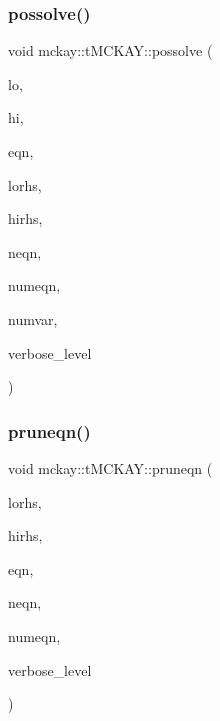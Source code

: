 \subsubsection{\texorpdfstring{possolve()}{possolve()}}
{\footnotesize\ttfamily void mckay\+::t\+M\+C\+K\+A\+Y\+::possolve (\begin{DoxyParamCaption}\item[{vector$<$ int $>$ \&}]{lo,  }\item[{vector$<$ int $>$ \&}]{hi,  }\item[{vector$<$ \mbox{\hyperlink{namespacemckay_a4f7cb66ed07fe573b2b08e73ab462c1a}{equation}} $>$ \&}]{eqn,  }\item[{vector$<$ int $>$ \&}]{lorhs,  }\item[{vector$<$ int $>$ \&}]{hirhs,  }\item[{vector$<$ int $>$ \&}]{neqn,  }\item[{int}]{numeqn,  }\item[{int}]{numvar,  }\item[{int}]{verbose\+\_\+level }\end{DoxyParamCaption})}

\mbox{\label{classmckay_1_1t_m_c_k_a_y_a0faf3830d1f34b4a6128fd237e0a9165}} 
\subsubsection{\texorpdfstring{pruneqn()}{pruneqn()}}
{\footnotesize\ttfamily void mckay\+::t\+M\+C\+K\+A\+Y\+::pruneqn (\begin{DoxyParamCaption}\item[{vector$<$ int $>$ \&}]{lorhs,  }\item[{vector$<$ int $>$ \&}]{hirhs,  }\item[{vector$<$ \mbox{\hyperlink{namespacemckay_a4f7cb66ed07fe573b2b08e73ab462c1a}{equation}} $>$ \&}]{eqn,  }\item[{vector$<$ int $>$ \&}]{neqn,  }\item[{int}]{numeqn,  }\item[{\mbox{\hyperlink{galois_8h_a09fddde158a3a20bd2dcadb609de11dc}{I\+NT}}}]{verbose\+\_\+level }\end{DoxyParamCaption})\hspace{0.3cm}{\ttfamily [protected]}}

